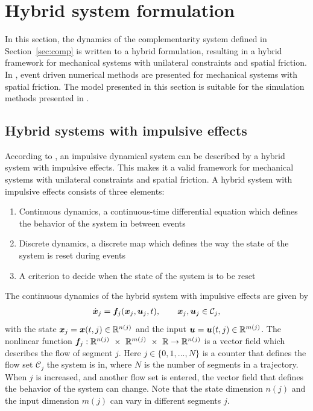 \documentclass[../DC2017114Bouma.tex]{subfiles}
\begin{document}
\section{Hybrid system formulation}
In this section, the dynamics of the complementarity system defined in Section~\ref{sec:comp} is written to a hybrid formulation, resulting in a hybrid framework for mechanical systems with unilateral constraints and spatial friction. In \cite[p. 222]{Acary2008}, event driven numerical methods are presented for mechanical systems with spatial friction. The model presented in this section is suitable for the simulation methods presented in \cite{Acary2008}.

%
\subsection{Hybrid systems with impulsive effects}\label{sec:2hyb}
According to \cite{Haddad2006}, an impulsive dynamical system can be described by a hybrid system with impulsive effects. This makes it a valid framework for mechanical systems with unilateral constraints and spatial friction. A hybrid system with impulsive effects consists of three elements:
\begin{enumerate}
\item Continuous dynamics, a continuous-time differential equation which defines the behavior of the system in between events
\item Discrete dynamics, a discrete map which defines the way the state of the system is reset during events
\item A criterion to decide when the state of the system is to be reset
\end{enumerate}

The continuous dynamics of the hybrid system with impulsive effects are given by
\begin{align}
\dot{{\boldsymbol{x}}}_j ={\boldsymbol{f}}_j({\boldsymbol{x}}_j,{\boldsymbol{u}}_j,t), \qquad{\boldsymbol{x}}_j,{\boldsymbol{u}}_j\in \mathcal{C}_j,\label{eq:hybimp1}
\end{align}
with the state ${\boldsymbol{x}}_j = {\boldsymbol{x}}(t,j)\in\mathbb{R}^{n(j)}$ and the input ${\boldsymbol{u}} = {\boldsymbol{u}}(t,j)\in\mathbb{R}^{m(j)}$. The nonlinear function $\fb_j:\Rbb^{n(j)}\ \times\ \Rbb^{m(j)}\ \times\ \Rbb\rightarrow \Rbb^{n(j)}$ is a vector field which describes the flow of segment $j$. Here $j\in\{0,1,...,N\}$ is a counter that defines the flow set $\mathcal{C}_j$ the system is in, where $N$ is the number of segments in a trajectory. When $j$ is increased, and another flow set is entered, the vector field that defines the behavior of the system can change. Note that the state dimension $n(j)$ and the input dimension $m(j)$ can vary in different segments $j$.
\end{document}
